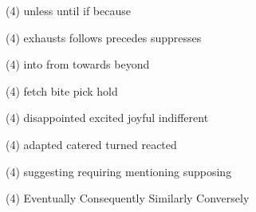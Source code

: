 \item
\begin{tasks}(4)
	\task unless
	\task until
	\task if
	\task because
\end{tasks}
\item
\begin{tasks}(4)
	\task exhausts
	\task follows
	\task precedes
	\task suppresses
\end{tasks}
\item
\begin{tasks}(4)
	\task into
	\task from
	\task towards
	\task beyond
\end{tasks}
\item
\begin{tasks}(4)
	\task fetch
	\task bite
	\task pick
	\task hold
\end{tasks}
\item
\begin{tasks}(4)
	\task disappointed
	\task excited
	\task joyful
	\task indifferent
\end{tasks}
\item
\begin{tasks}(4)
	\task adapted
	\task catered
	\task turned
	\task reacted
\end{tasks}
\item
\begin{tasks}(4)
	\task suggesting
	\task requiring
	\task mentioning
	\task supposing
\end{tasks}
\item
\begin{tasks}(4)
	\task Eventually
	\task Consequently
	\task Similarly
	\task Conversely
\end{tasks}